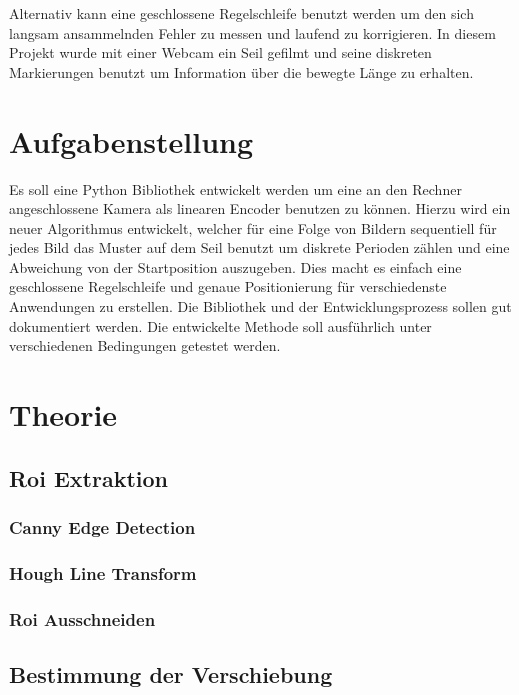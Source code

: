 \documentclass[10pt,a4paper]{scrreport}
\begin{document}
Alternativ kann eine geschlossene Regelschleife benutzt werden um den sich langsam ansammelnden Fehler zu messen und laufend zu korrigieren. In diesem Projekt wurde mit einer Webcam ein Seil gefilmt und seine diskreten Markierungen benutzt um Information über die bewegte Länge zu erhalten.

\section{Aufgabenstellung}
Es soll eine Python Bibliothek entwickelt werden um eine an den Rechner angeschlossene Kamera als linearen Encoder benutzen zu können. Hierzu wird ein neuer Algorithmus entwickelt, welcher für eine Folge von Bildern sequentiell für jedes Bild das Muster auf dem Seil benutzt um diskrete Perioden zählen und eine Abweichung von der Startposition auszugeben.
Dies macht es einfach eine geschlossene Regelschleife und genaue Positionierung für verschiedenste Anwendungen zu erstellen.
Die Bibliothek und der Entwicklungsprozess sollen gut dokumentiert werden.
Die entwickelte Methode soll ausführlich unter verschiedenen Bedingungen getestet werden.


\section{Theorie}

	\subsection{Roi Extraktion}
	
		\subsubsection{Canny Edge Detection}
		
		\subsubsection{Hough Line Transform}
		
		\subsubsection{Roi Ausschneiden}
		
	\subsection{Bestimmung der Verschiebung}
	
\end{document}
